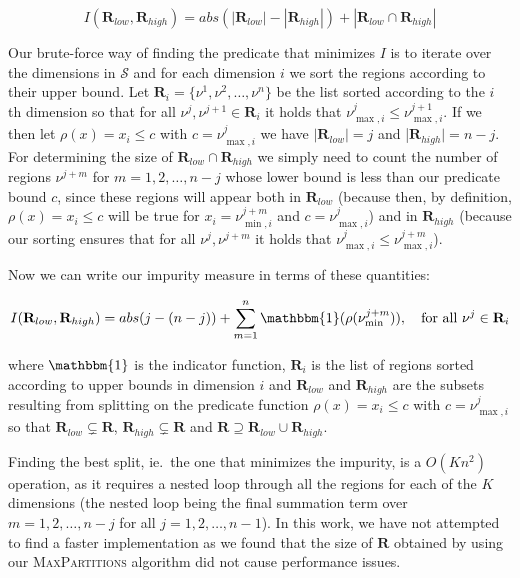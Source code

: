 \[
    I(\mathbf{R}_{low}, \mathbf{R}_{high})  = abs(|\mathbf{R}_{low}| -
    |\mathbf{R}_{high}|) + |\mathbf{R}_{low} \cap \mathbf{R}_{high}|
\]


Our brute-force way of finding the predicate that minimizes $I$ is to iterate
over the dimensions in $\mathcal{S}$ and for each dimension $i$ we sort the
regions according to their upper bound. Let $\mathbf{R}_i = \{ \nu^1, \nu^2,
\ldots, \nu^n \}$ be the list sorted according to the $i$ th dimension so that
for all $\nu^j, \nu^{j+1} \in \mathbf{R}_{i}$ it holds that $\nu^{j}_{\max,i} \le
\nu^{j+1}_{\max,i}$. If we then let $\rho(x) = x_i \le c$ with $c =
\nu^{j}_{\max,i}$ we have $|\mathbf{R}_{low}| = j$ and |$\mathbf{R}_{high}| = n
- j$. For determining the size of $\mathbf{R}_{low} \cap \mathbf{R}_{high}$ we
simply need to count the number of regions $\nu^{j+m}$ for $m = 1, 2, \ldots,
n-j$ whose lower bound is less than our predicate bound $c$, since these regions
will appear both in $\mathbf{R}_{low}$ (because then, by definition, $\rho(x) = x_i
\le c$ will be true for $x_i = \nu^{j+m}_{\min,i}$ and $c = \nu^{j}_{\max,i}$)
and in $\mathbf{R}_{high}$ (because our sorting ensures that for all
$\nu^{j},\nu^{j+m}$ it holds that $\nu^{j}_{\max,i} \le \nu^{j+m}_{\max,i}$).

Now we can write our impurity measure in terms of these quantities:

\[
    I(\mathbf{R}_{low}, \mathbf{R}_{high}) = abs(j - (n - j)) +
    \sum^{n}_{m=1} \mathbbm{1}(\rho(\nu^{j+m}_{\min})), \quad
    \text{for all }\nu^{j} \in \mathbf{R}_{i}
\] 

\noindent
where $\mathbbm{1}$ is the indicator function, $\mathbf{R}_{i}$ is the list of
regions sorted according to upper bounds in dimension $i$ and $\mathbf{R}_{low}$ and
$\mathbf{R}_{high}$ are the subsets resulting from splitting on the predicate
function $\rho(x) = x_i \le c$ with $c = \nu^{j}_{\max,i}$ so that
$\mathbf{R}_{low} \subsetneq \mathbf{R}$, $\mathbf{R}_{high} \subsetneq
\mathbf{R}$ and $\mathbf{R} \supseteq \mathbf{R}_{low} \cup \mathbf{R}_{high}$.

Finding the best split, ie.\ the one that minimizes the impurity, is a $O(Kn^2)$
operation, as it requires a nested loop through all the regions for each
of the $K $dimensions (the nested loop being the final summation term over $m =
1, 2, \ldots, n - j$ for all $j = 1, 2, \ldots, n - 1$). In this work, we have
not attempted to find a faster implementation as we found that the size of
$\mathbf{R}$ obtained by using our \textsc{MaxPartitions} algorithm did not
cause performance issues.


